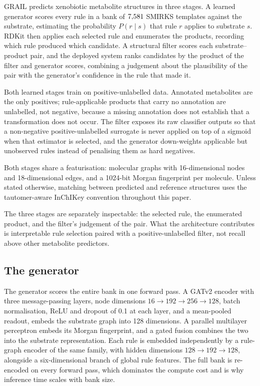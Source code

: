 GRAIL predicts xenobiotic metabolite structures in three stages. A learned generator scores every
rule in a bank of $7{,}581$ SMIRKS templates against the substrate, estimating the probability
$P(r\mid s)$ that rule $r$ applies to substrate $s$. RDKit then applies each selected rule and
enumerates the products, recording which rule produced which candidate. A structural filter scores
each substrate--product pair, and the deployed system ranks candidates by the product of the
filter and generator scores, combining a judgement about the plausibility of the pair with the
generator's confidence in the rule that made it.

Both learned stages train on positive-unlabelled data. Annotated metabolites are the only
positives; rule-applicable products that carry no annotation are unlabelled, not negative,
because a missing annotation does not establish that a transformation does not occur. The filter
exposes its raw classifier outputs so that a non-negative positive-unlabelled surrogate is never
applied on top of a sigmoid when that estimator is selected, and the generator down-weights
applicable but unobserved rules instead of penalising them as hard negatives.

Both stages share a featurisation: molecular graphs with 16-dimensional nodes and 18-dimensional
edges, and a 1024-bit Morgan fingerprint per molecule. Unless stated otherwise, matching between
predicted and reference structures uses the tautomer-aware InChIKey convention throughout this
paper.

The three stages are separately inspectable: the selected rule, the enumerated product, and the
filter's judgement of the pair. What the architecture contributes is interpretable rule selection
paired with a positive-unlabelled filter, not recall above other metabolite predictors.

\subsection{The generator}

The generator scores the entire bank in one forward pass. A GATv2 encoder with three
message-passing layers, node dimensions $16\to192\to256\to128$, batch normalisation, ReLU and
dropout of 0.1 at each layer, and a mean-pooled readout, embeds the substrate graph into 128
dimensions. A parallel multilayer perceptron embeds its Morgan fingerprint, and a gated fusion
combines the two into the substrate representation. Each rule is embedded independently by a
rule-graph encoder of the same family, with hidden dimensions $128\to192\to128$, alongside a
six-dimensional branch of global rule features. The full bank is re-encoded on every forward pass,
which dominates the compute cost and is why inference time scales with bank size.

